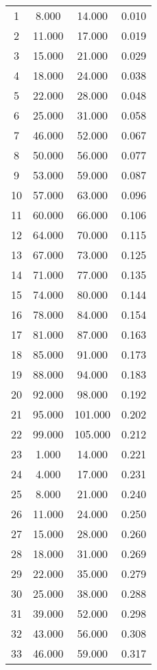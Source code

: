 % 
\begin{tabular}{cccc}
  \hline
  \hline
1 & 8.000 & 14.000 & 0.010 \\ 
  2 & 11.000 & 17.000 & 0.019 \\ 
  3 & 15.000 & 21.000 & 0.029 \\ 
  4 & 18.000 & 24.000 & 0.038 \\ 
  5 & 22.000 & 28.000 & 0.048 \\ 
  6 & 25.000 & 31.000 & 0.058 \\ 
  7 & 46.000 & 52.000 & 0.067 \\ 
  8 & 50.000 & 56.000 & 0.077 \\ 
  9 & 53.000 & 59.000 & 0.087 \\ 
  10 & 57.000 & 63.000 & 0.096 \\ 
  11 & 60.000 & 66.000 & 0.106 \\ 
  12 & 64.000 & 70.000 & 0.115 \\ 
  13 & 67.000 & 73.000 & 0.125 \\ 
  14 & 71.000 & 77.000 & 0.135 \\ 
  15 & 74.000 & 80.000 & 0.144 \\ 
  16 & 78.000 & 84.000 & 0.154 \\ 
  17 & 81.000 & 87.000 & 0.163 \\ 
  18 & 85.000 & 91.000 & 0.173 \\ 
  19 & 88.000 & 94.000 & 0.183 \\ 
  20 & 92.000 & 98.000 & 0.192 \\ 
  21 & 95.000 & 101.000 & 0.202 \\ 
  22 & 99.000 & 105.000 & 0.212 \\ 
  23 & 1.000 & 14.000 & 0.221 \\ 
  24 & 4.000 & 17.000 & 0.231 \\ 
  25 & 8.000 & 21.000 & 0.240 \\ 
  26 & 11.000 & 24.000 & 0.250 \\ 
  27 & 15.000 & 28.000 & 0.260 \\ 
  28 & 18.000 & 31.000 & 0.269 \\ 
  29 & 22.000 & 35.000 & 0.279 \\ 
  30 & 25.000 & 38.000 & 0.288 \\ 
  31 & 39.000 & 52.000 & 0.298 \\ 
  32 & 43.000 & 56.000 & 0.308 \\ 
  33 & 46.000 & 59.000 & 0.317 \\ 

\end{tabular}
